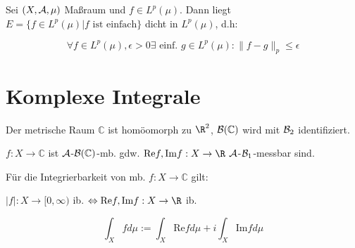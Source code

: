 Sei $(X,\mathcal{A},\mu)$ Maßraum und $f \in L^p(\mu)$. Dann liegt $E = \{ f \in L^p(\mu) | f \text{ ist einfach} \}$ dicht in $L^p(\mu)$, d.h:

\vspace{-4mm}
$$\forall f \in L^p(\mu), \epsilon > 0 \exists \text{ einf. } g \in L^p(\mu) : \| f - g \|_p \leq \epsilon$$

\section*{Komplexe Integrale}

Der metrische Raum $\mathbb{C}$ ist homöomorph zu $\R^2$, $\mathcal{B}(\mathbb{C})$ wird mit $\mathcal{B}_2$ identifiziert.

$f : X \to \mathbb{C}$ ist $\mathcal{A}$-$\mathcal{B}(\mathbb{C})$-mb. gdw. $\text{Re} f, \text{Im} f : X \to \R$ $\mathcal{A}$-$\mathcal{B}_1$-messbar sind.

Für die Integrierbarkeit von mb. $f : X \to \mathbb{C}$ gilt:

$|f| : X \to [0,\infty)$ ib. $\Leftrightarrow \text{Re} f, \text{Im} f : X \to \R$ ib.

$$\int_X f d\mu := \int_X \text{Re} f d\mu + i \int_X \text{Im} f d\mu$$

